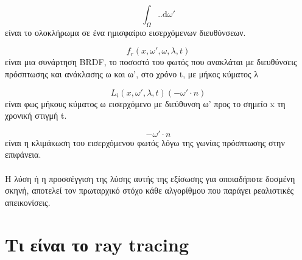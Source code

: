 \begin{sloppypar}
\begin{equation}
	\int_\Omega .. \mathrm{d}\omega'
\end{equation}
είναι το ολοκλήρωμα σε ένα ημισφαίριο εισερχόμενων διευθύνσεων.

\begin{equation}
	f_r(x, \omega', \omega, \lambda, t)
\end{equation}
είναι μια συνάρτηση BRDF, το ποσοστό του φωτός που ανακλάται με διευθύνσεις πρόσπτωσης και ανάκλασης ω και ω', στο χρόνο t, με μήκος κύματος λ

\begin{equation}
	L_i(x, \omega', \lambda, t)(-\omega' \cdot n)
\end{equation}
είναι φως μήκους κύματος ω εισερχόμενο με διεύθυνση ω' προς το σημείο x τη χρονική στιγμή t.

\begin{equation}
	-\omega' \cdot n
\end{equation}
είναι η κλιμάκωση του εισερχόμενου φωτός λόγω της γωνίας πρόσπτωσης στην επιφάνεια.

\paragraph{}
H λύση ή η προσσέγγιση της λύσης αυτής της εξίσωσης για οποιαδήποτε δοσμένη σκηνή, αποτελεί τον πρωταρχικό στόχο 
κάθε αλγορίθμου που παράγει ρεαλιστικές απεικονίσεις.

\section{Τι είναι το ray tracing}

\end{sloppypar}
